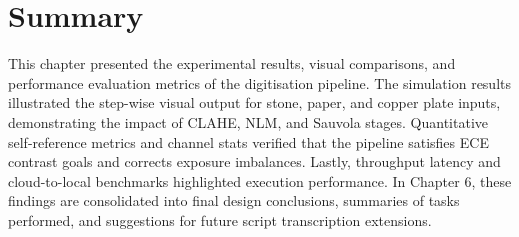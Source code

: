 \section*{Summary}

This chapter presented the experimental results, visual comparisons, and performance evaluation metrics of the digitisation pipeline. The simulation results illustrated the step-wise visual output for stone, paper, and copper plate inputs, demonstrating the impact of CLAHE, NLM, and Sauvola stages. Quantitative self-reference metrics and channel stats verified that the pipeline satisfies ECE contrast goals and corrects exposure imbalances. Lastly, throughput latency and cloud-to-local benchmarks highlighted execution performance. In Chapter 6, these findings are consolidated into final design conclusions, summaries of tasks performed, and suggestions for future script transcription extensions.
